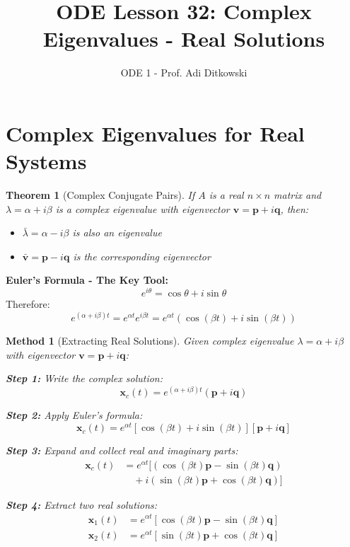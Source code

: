 \documentclass[12pt]{article}
\title{ODE Lesson 32: Complex Eigenvalues - Real Solutions}
\author{ODE 1 - Prof. Adi Ditkowski}
\date{}
\newtheorem{theorem}{Theorem}
\newtheorem{method}{Method}
\begin{document}
\maketitle

\section{Complex Eigenvalues for Real Systems}

\begin{theorem}[Complex Conjugate Pairs]
If $A$ is a real $n \times  n$ matrix and $\lambda = \alpha + i\beta$ is a complex eigenvalue with eigenvector $\mathbf{v} = \mathbf{p} + i\mathbf{q}$, then:
\begin{itemize}
\item $\bar{\lambda} = \alpha - i\beta$ is also an eigenvalue
\item $\bar{\mathbf{v}} = \mathbf{p} - i\mathbf{q}$ is the corresponding eigenvector
\end{itemize}
\end{theorem}

\begin{complex}
\textbf{Euler's Formula - The Key Tool:}
\[e^{i\theta} = \cos\theta + i\sin\theta\]
Therefore:
\[e^{(\alpha + i\beta)t} = e^{\alpha t}e^{i\beta t} = e^{\alpha t}(\cos(\beta t) + i\sin(\beta t))\]
\end{complex}

\begin{method}[Extracting Real Solutions]
Given complex eigenvalue $\lambda = \alpha + i\beta$ with eigenvector $\mathbf{v} = \mathbf{p} + i\mathbf{q}$:

\textbf{Step 1:} Write the complex solution:
\[\mathbf{x}_{c}(t) = e^{(\alpha + i\beta)t}(\mathbf{p} + i\mathbf{q})\]

\textbf{Step 2:} Apply Euler's formula:
\[\mathbf{x}_{c}(t) = e^{\alpha t}[\cos(\beta t) + i\sin(\beta t)][\mathbf{p} + i\mathbf{q}]\]

\textbf{Step 3:} Expand and collect real and imaginary parts:
\begin{align}
\mathbf{x}_{c}(t) &= e^{\alpha t}[(\cos(\beta t)\mathbf{p} - \sin(\beta t)\mathbf{q}) \\
&\quad + i(\sin(\beta t)\mathbf{p} + \cos(\beta t)\mathbf{q})]
\end{align}

\textbf{Step 4:} Extract two real solutions:
\begin{align}
\mathbf{x}_{1}(t) &= e^{\alpha t}[\cos(\beta t)\mathbf{p} - \sin(\beta t)\mathbf{q}] \\
\mathbf{x}_{2}(t) &= e^{\alpha t}[\sin(\beta t)\mathbf{p} + \cos(\beta t)\mathbf{q}]
\end{align}
\end{method}
\end{document}
